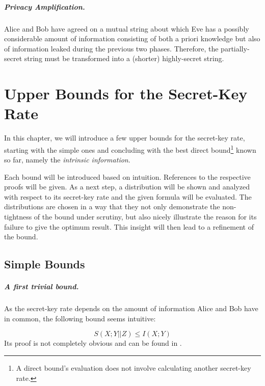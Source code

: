 \documentclass[a4paper, twoside, openany]{report}
\newcommand{\srate}{S(X;Y||Z)}
\theoremstyle{plain}
\theoremstyle{definition}
\begin{document}
\paragraph{Privacy Amplification.} Alice and Bob have agreed on a mutual string about which Eve has a possibly considerable amount of information consisting of both a priori knowledge but also of information leaked during the previous two phases. Therefore, the partially-secret string must be transformed into a (shorter) highly-secret string.


\chapter{Upper Bounds for the Secret-Key Rate} \label{ch:UpperBounds}

In this chapter, we will introduce a few upper bounds for the secret-key rate, starting with the simple ones and concluding with the best direct bound\footnote{A direct bound's evaluation does not involve calculating another secret-key rate.} known so far, namely the \emph{intrinsic information}.

Each bound will be introduced based on intuition. References to the respective proofs will be given. As a next step, a distribution will be shown and analyzed with respect to its secret-key rate and the given formula will be evaluated. The distributions are chosen in a way that they not only demonstrate the non-tightness of the bound under scrutiny, but also nicely illustrate the reason for its failure to give the optimum result. This insight will then lead to a refinement of the bound.


\section{Simple Bounds} \label{SimpleBounds}

\paragraph{A first trivial bound.} As the secret-key rate depends on the amount of information Alice and Bob have in common, the following bound seems intuitive:

\begin{equation} \label{ubnd:infoXY}
\srate \leq I(X;Y)
\end{equation}
Its proof is not completely obvious and can be found in \cite{ka}.
\end{document}
